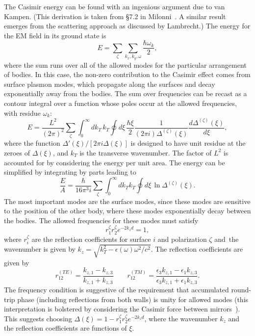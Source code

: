 The Casimir energy can be found with an ingenious argument due to van Kampen\etal\cite{vanKampen1968}.
(This derivation is taken from \S 7.2 in Milonni~\cite{Milonni1994}.
A similar result emerges from the scattering approach as discussed by Lambrecht\etal\cite{Lambrecht2011}.)
The energy for the EM field in its ground state is 
\begin{equation}
  E = \sum_{\zeta}\sum_{k_x,k_y,\omega} \frac{\hbar\omega_k}{2},
\end{equation}
where the sum runs over all of the allowed modes for the particular arrangement of bodies.  
In this case, the  non-zero contribution to the Casimir effect comes from surface plasmon modes, which propagate along the surfaces
and decay exponentially away from the bodies.  
The sum over frequencies can be recast as a contour integral over a function whose poles occur at the allowed
frequencies, with residue $\omega_k$:  
\begin{equation}
  E = \frac{L^2}{(2\pi)^2}\sum_{\zeta}\int_0^\infty dk_T\,k_T\oint d\xi\, 
  \frac{\hbar \xi}{2} \frac{1}{(2\pi i)\Delta^{(\zeta)}(\xi)}\frac{d\Delta^{(\zeta)}(\xi)}{d\xi},
\end{equation}
where the function $\Delta'(\xi)/[2\pi i\Delta(\xi)]$ is designed to have unit residue at the zeroes of $\Delta(\xi)$, 
and $k_T$ is the transverse wavenumber.  The factor of $L^2$ is accounted for by considering the energy 
per unit area.  
The energy can be simplified by integrating by parts leading to 
\begin{equation}
  \frac{E}{A} = \frac{\hbar}{16\pi^3 i}\sum_{\zeta}\int_0^\infty dk_Tk_T\oint d\xi \, \ln\Delta^{(\zeta)}(\xi).
\end{equation}
The most important modes are the surface modes, since these modes are sensitive to the position of the other body, where
these modes exponentially decay between the bodies.
The allowed frequencies for these modes must satisfy 
\begin{equation}
  r^{\zeta}_1r^{\zeta}_2 e^{-2k_z d}=1,
\end{equation}
where $r^\zeta_i$ are the reflection coefficients for surface $i$ and polarization $\zeta$ and\
the wavenumber is given by $k_z=\sqrt{k_T^2-\epsilon(\omega)\omega^2/c^2}$.  The reflection coefficients
are given by 
\begin{equation}
  r^{(TE)}_{12} = \frac{k_{z,1}-k_{z,3}}{k_{z,1}+k_{z,3}} \qquad 
  r^{(TM)}_{12} = \frac{\epsilon_3k_{z,1}-\epsilon_1k_{z,3}}{\epsilon_3k_{z,1}+\epsilon_1k_{z,3}}.
\end{equation}
The frequency condition is suggestive of the requirement that accumulated round-trip phase 
(including reflections from both walls) is unity for
allowed modes (this interpretation is bolstered by considering the Casimir force between mirrors~\cite{Genet2003}).
This suggests choosing $\Delta(\xi) = 1-r^{\zeta}_1r^{\zeta}_2 e^{-2k_z d}$, where the wavenumber $k_z$
and the reflection coefficients are functions of $\xi$.  

